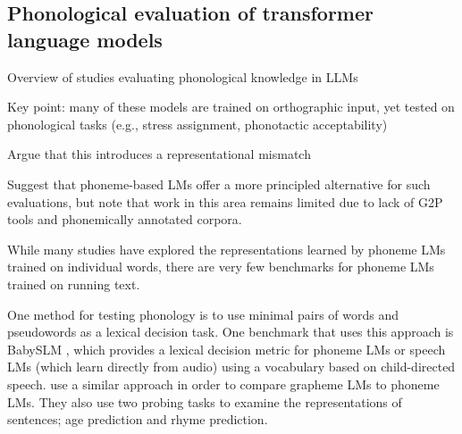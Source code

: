 \subsection{Phonological evaluation of transformer language models}

Overview of studies evaluating phonological knowledge in LLMs

Key point: many of these models are trained on orthographic input, yet tested on phonological tasks (e.g., stress assignment, phonotactic acceptability)

Argue that this introduces a representational mismatch

Suggest that phoneme-based LMs offer a more principled alternative for such evaluations, but note that work in this area remains limited due to lack of G2P tools and phonemically annotated corpora.



While many studies have explored the representations learned by phoneme LMs trained on individual words, there are very few benchmarks for phoneme LMs trained on running text.

One method for testing phonology is to use minimal pairs of words and pseudowords as a lexical decision task. One benchmark that uses this approach is BabySLM \citep{lavechin}, which provides a lexical decision metric for phoneme LMs or speech LMs (which learn directly from audio) using a vocabulary based on child-directed speech. \citet{bunzeck-etal-2025-small} use a similar approach in order to compare grapheme LMs to phoneme LMs. They also use two probing tasks to examine the representations of sentences; age prediction and rhyme prediction. %



